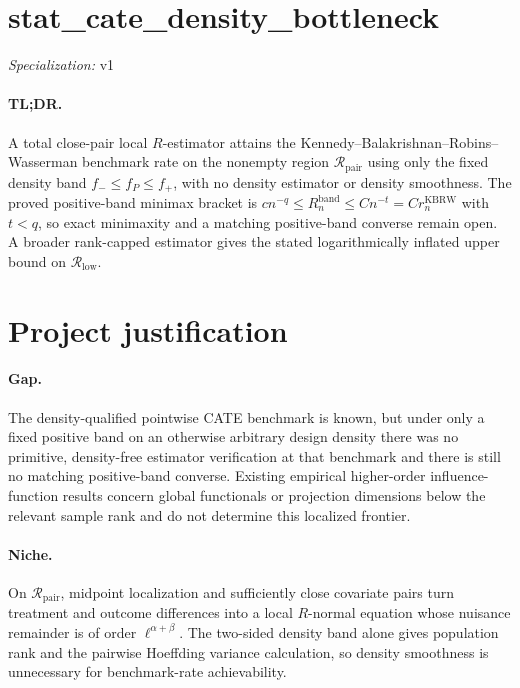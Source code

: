 \documentclass{article}
\begin{document}
\sloppy

\section*{stat\_\allowbreak{}cate\_\allowbreak{}density\_\allowbreak{}bottleneck}

\noindent\textit{Specialization:} v1\par

\paragraph{TL;DR.} A total close-pair local \(R\)-estimator attains the Kennedy--Balakrishnan--Robins--Wasserman benchmark rate on the nonempty region \(\mathcal R_{\mathrm{pair}}\) using only the fixed density band \(f_{-}\leq f_P\leq f_{+}\), with no density estimator or density smoothness.  The proved positive-band minimax bracket is \(c n^{-q}\leq R_n^{\mathrm{band}}\leq Cn^{-t}=Cr_n^{\mathrm{KBRW}}\) with \(t<q\), so exact minimaxity and a matching positive-band converse remain open.  A broader rank-capped estimator gives the stated logarithmically inflated upper bound on \(\mathcal R_{\mathrm{low}}\).

\section{Project justification}

\paragraph{Gap.} The density-qualified pointwise CATE benchmark is known, but under only a fixed positive band on an otherwise arbitrary design density there was no primitive, density-free estimator verification at that benchmark and there is still no matching positive-band converse.  Existing empirical higher-order influence-function results concern global functionals or projection dimensions below the relevant sample rank and do not determine this localized frontier.

\paragraph{Niche.} On \(\mathcal R_{\mathrm{pair}}\), midpoint localization and sufficiently close covariate pairs turn treatment and outcome differences into a local \(R\)-normal equation whose nuisance remainder is of order \(\ell^{\alpha+\beta}\).  The two-sided density band alone gives population rank and the pairwise Hoeffding variance calculation, so density smoothness is unnecessary for benchmark-rate achievability.
\end{document}
